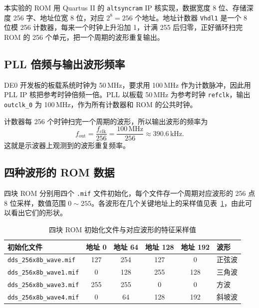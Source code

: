 \documentclass[12pt]{ctexart}
\begin{document}
本实验的 ROM 用 Quartus II 的 \texttt{altsyncram} IP 核实现，数据宽度 8 位、存储深度 256 字、地址位宽 8 位，对应 $2^8 = 256$ 个地址。地址计数器 \texttt{Vhdl1} 是一个 8 位模 256 计数器，每来一个时钟上升沿加 1，计满 255 后归零，正好循环扫完 ROM 的 256 个单元，把一个周期的波形重复输出。

\subsection{PLL 倍频与输出波形频率}

DE0 开发板的板载系统时钟为 50\,MHz，要求用 100\,MHz 作为计数脉冲，因此用 PLL IP 核把参考时钟倍频一倍。PLL 以板载 50\,MHz 为参考时钟 \texttt{refclk}，输出 \texttt{outclk\_0} 为 100\,MHz，作为所有计数器和 ROM 的公共时钟。

计数器每 256 个时钟扫完一个周期的波形，所以输出波形的频率为
\[
    f_{\text{out}} = \frac{f_{\text{clk}}}{256} = \frac{100\,\text{MHz}}{256} \approx 390.6\,\text{kHz}.
\]
这就是示波器上观测到的波形重复频率。

\subsection{四种波形的 ROM 数据}

四块 ROM 分别用四个 \texttt{.mif} 文件初始化，每个文件存一个周期对应波形的 256 点 8 位采样，数值范围 $0\sim255$。各波形在几个关键地址上的采样值见表~\ref{tab:wavedata}，由此可以看出它们的形状。

\begin{table}[H]
    \centering
    \caption{四块 ROM 初始化文件与对应波形的特征采样值}
    \label{tab:wavedata}
    \small
    \begin{tabular}{lccccl}
        \toprule
        \textbf{初始化文件} & \textbf{地址 0} & \textbf{地址 64} & \textbf{地址 128} & \textbf{地址 192} & \textbf{波形} \\
        \midrule
        \texttt{dds\_256x8b\_wave.mif}  & 127 & 254 & 127 & 0   & 正弦波 \\
        \texttt{dds\_256x8b\_wave1.mif} & 0   & 128 & 255 & 128 & 三角波 \\
        \texttt{dds\_256x8b\_wave3.mif} & 255 & 255 & 0   & 0   & 方波 \\
        \texttt{dds\_256x8b\_wave4.mif} & 0   & 64  & 128 & 192 & 斜坡波 \\
        \bottomrule
    \end{tabular}
\end{table}
\end{document}

